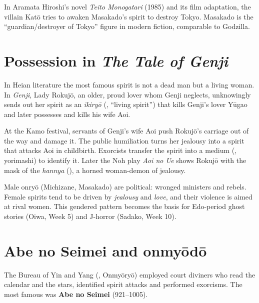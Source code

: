 \begin{remark}
In Aramata Hiroshi's novel \emph{Teito Monogatari} (1985) and its film adaptation, the
villain Katō tries to awaken Masakado's spirit to destroy Tokyo. Masakado is the
``guardian/destroyer of Tokyo'' figure in modern fiction, comparable to Godzilla.
\end{remark}

\section{Possession in \emph{The Tale of Genji}}

In Heian literature the most famous spirit is not a dead man but a living woman. In
\emph{Genji}, Lady Rokujō, an older, proud lover whom Genji neglects, unknowingly sends out
her spirit as an \emph{ikiryō} (, ``living spirit'') that kills Genji's lover
Yūgao and later possesses and kills his wife Aoi.

\begin{example}
At the Kamo festival, servants of Genji's wife Aoi push Rokujō's carriage out of the way and
damage it. The public humiliation turns her jealousy into a spirit that attacks Aoi in
childbirth. Exorcists transfer the spirit into a medium (, yorimashi) to
identify it. Later the Noh play \emph{Aoi no Ue} shows Rokujō with the mask of the
\emph{hannya} (), a horned woman-demon of jealousy.
\end{example}

\begin{important}
Male onryō (Michizane, Masakado) are political: wronged ministers and rebels. Female
spirits tend to be driven by \emph{jealousy} and \emph{love}, and their violence is aimed at
rival women. This gendered pattern becomes the basis for Edo-period ghost stories (Oiwa,
Week 5) and J-horror (Sadako, Week 10).
\end{important}

\section{Abe no Seimei and onmyōdō}

The Bureau of Yin and Yang (, Onmyōryō) employed court diviners who read the
calendar and the stars, identified spirit attacks and performed exorcisms. The most famous
was \textbf{Abe no Seimei} (921--1005).

